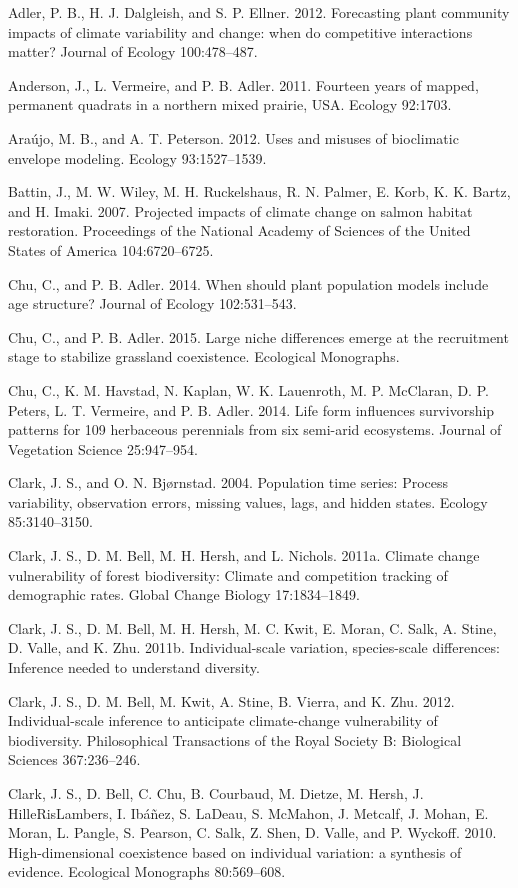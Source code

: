 \documentclass[12pt,]{article}
\begin{document}
Adler, P. B., H. J. Dalgleish, and S. P. Ellner. 2012. Forecasting plant
community impacts of climate variability and change: when do competitive
interactions matter? Journal of Ecology 100:478--487.

Anderson, J., L. Vermeire, and P. B. Adler. 2011. Fourteen years of
mapped, permanent quadrats in a northern mixed prairie, USA. Ecology
92:1703.

Araújo, M. B., and A. T. Peterson. 2012. Uses and misuses of bioclimatic
envelope modeling. Ecology 93:1527--1539.

Battin, J., M. W. Wiley, M. H. Ruckelshaus, R. N. Palmer, E. Korb, K. K.
Bartz, and H. Imaki. 2007. Projected impacts of climate change on salmon
habitat restoration. Proceedings of the National Academy of Sciences of
the United States of America 104:6720--6725.

Chu, C., and P. B. Adler. 2014. When should plant population models
include age structure? Journal of Ecology 102:531--543.

Chu, C., and P. B. Adler. 2015. Large niche differences emerge at the
recruitment stage to stabilize grassland coexistence. Ecological
Monographs.

Chu, C., K. M. Havstad, N. Kaplan, W. K. Lauenroth, M. P. McClaran, D.
P. Peters, L. T. Vermeire, and P. B. Adler. 2014. Life form influences
survivorship patterns for 109 herbaceous perennials from six semi-arid
ecosystems. Journal of Vegetation Science 25:947--954.

Clark, J. S., and O. N. Bjørnstad. 2004. Population time series: Process
variability, observation errors, missing values, lags, and hidden
states. Ecology 85:3140--3150.

Clark, J. S., D. M. Bell, M. H. Hersh, and L. Nichols. 2011a. Climate
change vulnerability of forest biodiversity: Climate and competition
tracking of demographic rates. Global Change Biology 17:1834--1849.

Clark, J. S., D. M. Bell, M. H. Hersh, M. C. Kwit, E. Moran, C. Salk, A.
Stine, D. Valle, and K. Zhu. 2011b. Individual-scale variation,
species-scale differences: Inference needed to understand diversity.

Clark, J. S., D. M. Bell, M. Kwit, A. Stine, B. Vierra, and K. Zhu.
2012. Individual-scale inference to anticipate climate-change
vulnerability of biodiversity. Philosophical Transactions of the Royal
Society B: Biological Sciences 367:236--246.

Clark, J. S., D. Bell, C. Chu, B. Courbaud, M. Dietze, M. Hersh, J.
HilleRisLambers, I. Ibáñez, S. LaDeau, S. McMahon, J. Metcalf, J. Mohan,
E. Moran, L. Pangle, S. Pearson, C. Salk, Z. Shen, D. Valle, and P.
Wyckoff. 2010. High-dimensional coexistence based on individual
variation: a synthesis of evidence. Ecological Monographs 80:569--608.
\end{document}
